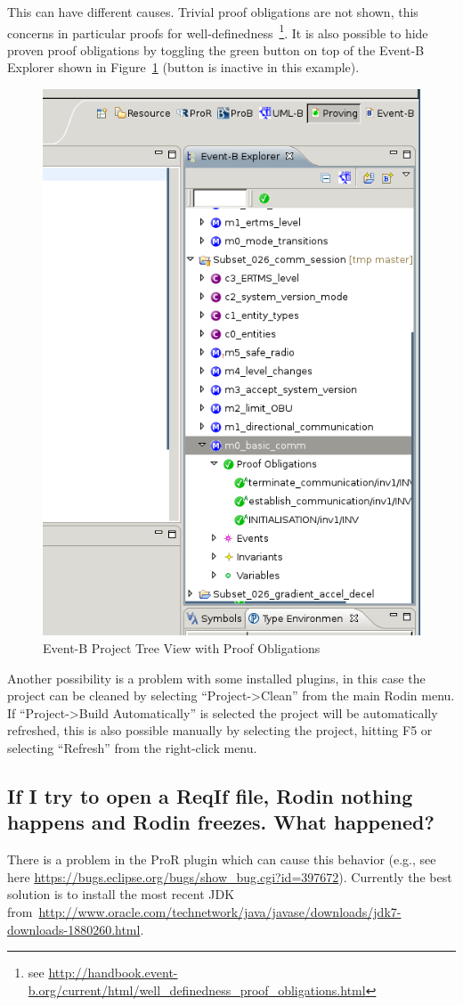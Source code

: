 \documentclass{template/openetcs_article}
\begin{document}
This can have different causes. Trivial proof obligations are not shown, this
concerns in particular proofs for well-definedness~\footnote{see
  \url{http://handbook.event-b.org/current/html/well_definedness_proof_obligations.html}}. It
is also possible to hide proven proof obligations by toggling the green button
on top of the Event-B Explorer shown in
Figure~\ref{fig:tree-proof-obligations} (button is inactive in this example).

\begin{figure}[H]
  \centering
  \includegraphics[width=.5\textwidth]{RodinEventBView}
  \caption{Event-B Project Tree View with Proof Obligations}
  \label{fig:tree-proof-obligations}
\end{figure}

Another possibility is a problem with some installed plugins, in this case the
project can be cleaned by selecting ``Project->Clean'' from the main Rodin
menu. If  ``Project->Build Automatically'' is selected the project will be
automatically refreshed, this is also possible manually by selecting the
project, hitting F5 or selecting ``Refresh'' from the right-click menu.

\subsection{If I try to open a ReqIf file, Rodin nothing happens and Rodin
  freezes. What happened?}
\label{sec:if-i-try}

There is a problem in the ProR plugin which can cause this behavior (e.g., see
here \url{https://bugs.eclipse.org/bugs/show_bug.cgi?id=397672}). Currently
the best solution is to install the most recent JDK
from~\url{http://www.oracle.com/technetwork/java/javase/downloads/jdk7-downloads-1880260.html}.
\end{document}
